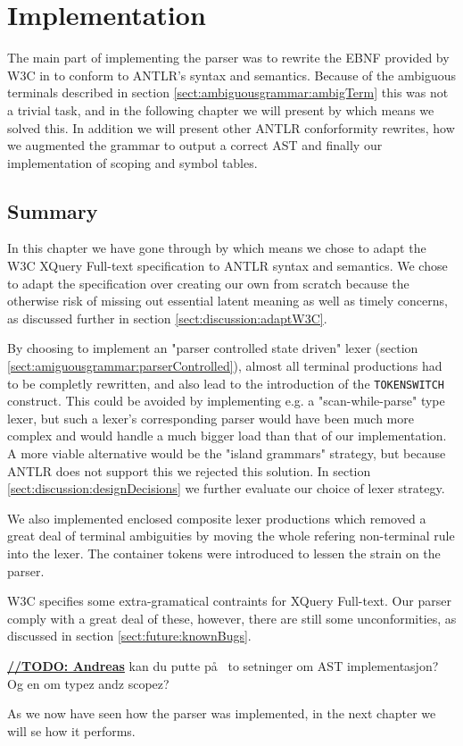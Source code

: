 \chapter{Implementation}


The main part of implementing the parser was to rewrite the EBNF provided by W3C in \cite{w3c01} to conform to ANTLR's syntax and semantics. Because of the ambiguous terminals described in section \ref{sect:ambiguousgrammar:ambigTerm} this was not a trivial task, and in the following chapter we will present by which means we solved this. In addition we will present other ANTLR conforformity rewrites, how we augmented the grammar to output a correct AST and finally our implementation of scoping and symbol tables.











\section{Summary}
In this chapter we have gone through by which means we chose to adapt the W3C XQuery Full-text specification to ANTLR syntax and semantics. We chose to adapt the specification over creating our own from scratch because the otherwise risk of missing out essential latent meaning as well as timely concerns, as discussed further in section \ref{sect:discussion:adaptW3C}.

By choosing to implement an "parser controlled state driven" lexer (section \ref{sect:amiguousgrammar:parserControlled}), almost all terminal productions had to be completly rewritten, and also lead to the introduction of the \verb!TOKENSWITCH! construct. This could be avoided by implementing e.g. a "scan-while-parse" type lexer, but such a lexer's corresponding parser would have been much more complex and would handle a much bigger load than that of our implementation. A more viable alternative would be the "island grammars" strategy, but because ANTLR does not support this we rejected this solution. In section \ref{sect:discussion:designDecisions} we further evaluate our choice of lexer strategy.

We also implemented enclosed composite lexer productions which removed a great deal of terminal ambiguities by moving the whole refering non-terminal rule into the lexer. The container tokens were introduced to lessen the strain on the parser.

W3C specifies some extra-gramatical contraints for XQuery Full-text. Our parser comply with a great deal of these, however, there are still some unconformities, as discussed in section \ref{sect:future:knownBugs}.

\underline{\textbf{\LARGE //TODO: Andreas}} kan du putte p\aa~ to setninger om AST implementasjon? Og en om typez andz scopez?

As we now have seen how the parser was implemented, in the next chapter we will se how it performs.